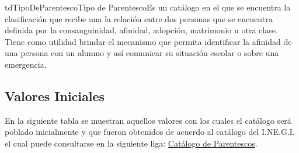 \begin{TipoDeDato}{tdTipoDeParentesco}{Tipo de Parentesco}{Es un catálogo en el que se encuentra la clasificación que recibe una la relación entre dos personas  que se encuentra definida por la consanguinidad, afinidad, adopción, matrimonio u otra clase. Tiene como utilidad brindar el mecanismo que permita identificar la afinidad de una persona con un alumno y así comunicar su situación escolar o sobre una emergencia.}
	
	\begin{tdAtributos}
	
		
		
	\end{tdAtributos}
	
	
	\subsection{Valores Iniciales}
	En la siguiente tabla se muestran aquellos valores con los cuales el catálogo será poblado inicialmente y que fueron obtenidos de acuerdo al catálogo del I.NE.G.I. el cual puede consultarse en la siguiente liga: \hyperlink{http://www3.inegi.org.mx/sistemas/clasificaciones/parentesco/parentesco.aspx}{Catálogo de Parentescos}.\cdtEmpty


\end{TipoDeDato}
